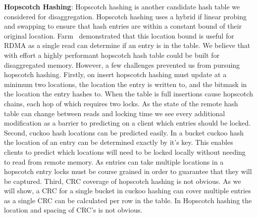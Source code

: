 
\textbf{Hopscotch Hashing}:
Hopscotch hashing is another candidate hash table
we considered for disaggregation. Hopscotch hashing uses a
hybrid if linear probing and swapping to ensure that hash
entries are within a constant bound of their original
location. Farm~\cite{farm} demonstrated that this location
bound is useful for RDMA as a single read can determine if
an entry is in the table. We believe that with effort a
highly performant hopscotch hash table could be built for
disaggregated memory. However, a few challenges prevented us
from pursuing hopscotch hashing. 
Firstly, on insert hopscotch hashing must update at a
minimum two locations, the location the entry is written to,
and the bitmask in the location the entry hashes to. When
the table is full insertions cause hopscotch chains, each
hop of which requires two locks. As the state of the remote
hash table can change between reads and locking time we see
every additional modification as a barrier to predicting on
a client which entries should be locked.
Second, cuckoo hash locations can be predicted easily. In a
bucket cuckoo hash the location of an entry can be
determined exactly by it's key. This enables clients to
predict which locations will need to be locked locally
without needing to read from remote memory. As entries can
take multiple locations in a hopscotch entry locks must be
course grained in order to guarantee that they will be
captured.
Third, CRC coverage of hopscotch hashing is not obvious. As
we will show, a CRC for a single bucket in cuckoo hashing
can cover multiple entries as a single CRC can be calculated
per row in the table. In Hopscotch hashing the location and
spacing of CRC's is not obvious.


